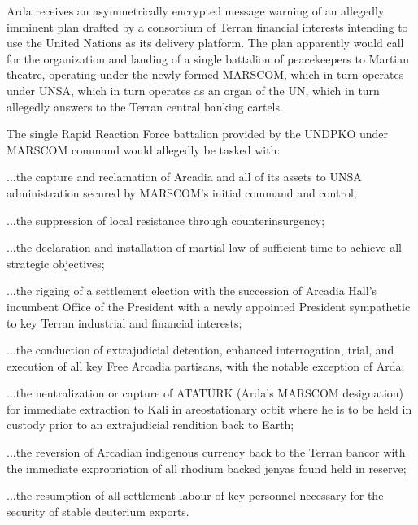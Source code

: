 Arda receives an asymmetrically encrypted message warning of an allegedly imminent plan drafted by a consortium of Terran financial interests intending to use the United Nations as its delivery platform. The plan apparently would call for the organization and landing of a single battalion of peacekeepers to Martian theatre, operating under the newly formed MARSCOM, which in turn operates under UNSA, which in turn operates as an organ of the UN, which in turn allegedly answers to the Terran central banking cartels.

The single Rapid Reaction Force battalion provided by the UNDPKO under MARSCOM command would allegedly be tasked with:

\startitemize[5]
\item ...the capture and reclamation of Arcadia and all of its assets to UNSA administration secured by MARSCOM's initial command and control;

\item ...the suppression of local resistance through counterinsurgency;

\item ...the declaration and installation of martial law of sufficient time to achieve all strategic objectives;

\item ...the rigging of a settlement election with the succession of Arcadia Hall's incumbent Office of the President with a newly appointed President sympathetic to key Terran industrial and financial interests; 

\item ...the conduction of extrajudicial detention, enhanced interrogation, trial, and execution of all key Free Arcadia partisans, with the notable exception of Arda;

\item ...the neutralization or capture of ATATÜRK (Arda's MARSCOM designation) for immediate extraction to Kali in areostationary orbit where he is to be held in custody prior to an extrajudicial rendition back to Earth;

\item ...the reversion of Arcadian indigenous currency back to the Terran bancor with the immediate expropriation of all rhodium backed jenyas found held in reserve;

\item ...the resumption of all settlement labour of key personnel necessary for the security of stable deuterium exports.
\stopitemize

